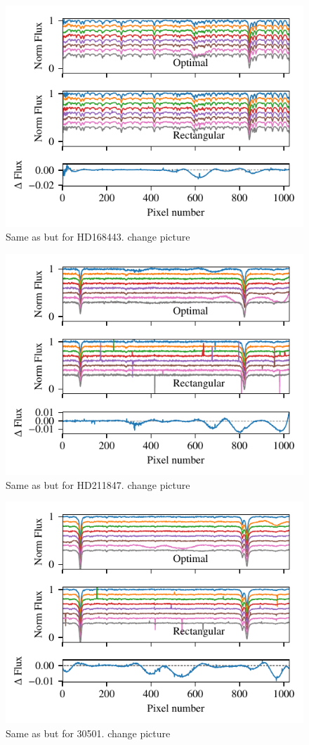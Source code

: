  \begin{figure}
     \centering
     \includegraphics[width=0.7\linewidth]{figures/appendix/bp_plots/extraction_comparision_HD168443-1_chip_4}
     \caption{Same as  but for HD168443. {\red{} change picture}}
     \label{fig:artefact_example5}
 \end{figure}
  \begin{figure}
     \centering
     \includegraphics[width=0.7\linewidth]{figures/appendix/bp_plots/extraction_comparision_HD211847-2_chip_2}
     \caption{Same as  but for HD211847. {\red{} change picture}}
     \label{fig:artefact_example6}
 \end{figure}
  \begin{figure}
    \centering
    \includegraphics[width=0.7\linewidth]{figures/appendix/bp_plots/extraction_comparision_HD30501-2b_chip_2}
    \caption{Same as  but for 30501. {\red{} change picture}}
    \label{fig:artefact_example7}
\end{figure}
